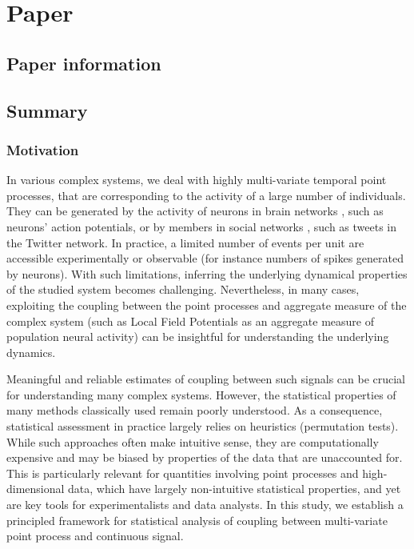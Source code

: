\chapter{Paper } 
\label{cha:paper-5}
\section*{Paper information} %



\section*{Summary} %
\subsection*{Motivation}
In various complex systems,
we deal with highly multi-variate temporal point processes,
that are corresponding to the activity of a large number of individuals.
They can be generated by the activity of neurons in brain networks \cite{johnsonPointProcessModels1996},
such as neurons' action potentials,
or by members in social networks \citep{daiRecurrentCoevolutionaryLatent2016,deLearningForecastingOpinion2016},
such as tweets in the Twitter network.
In practice, a limited number of events per unit are accessible experimentally or observable
(for instance numbers of spikes generated by neurons).
With such limitations, inferring the underlying dynamical properties of the studied system becomes challenging.
Nevertheless, in many cases, exploiting the coupling between the point processes and aggregate measure of the complex system (such as Local Field Potentials as an aggregate measure of population neural activity) can be insightful for understanding the underlying dynamics.

Meaningful and reliable estimates of coupling between such signals can be crucial for understanding many complex systems.
However, the statistical properties of many methods classically used remain poorly understood.
As a consequence, statistical assessment in practice largely relies on heuristics (\eg permutation tests).
While such approaches often make intuitive sense, they are computationally expensive and may be biased by properties of the data that are unaccounted for.
This is particularly relevant for quantities involving point processes and high-dimensional data, which have largely non-intuitive statistical properties, and yet are key tools for experimentalists and data analysts.
In this study, we establish a principled framework for statistical analysis of coupling between multi-variate point process and continuous signal.

